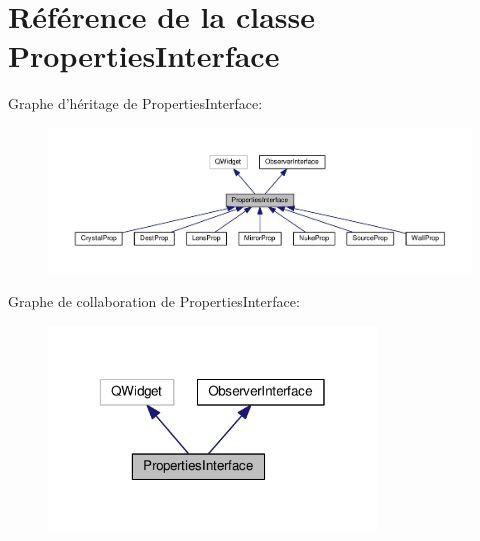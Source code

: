 \hypertarget{classPropertiesInterface}{\section{Référence de la classe Properties\+Interface}
\label{classPropertiesInterface}
}


Graphe d'héritage de Properties\+Interface\+:
\nopagebreak
\begin{figure}[H]
\begin{center}
\leavevmode
\includegraphics[width=350pt]{d5/d18/classPropertiesInterface__inherit__graph}
\end{center}
\end{figure}


Graphe de collaboration de Properties\+Interface\+:
\nopagebreak
\begin{figure}[H]
\begin{center}
\leavevmode
\includegraphics[width=247pt]{da/d04/classPropertiesInterface__coll__graph}
\end{center}
\end{figure}
